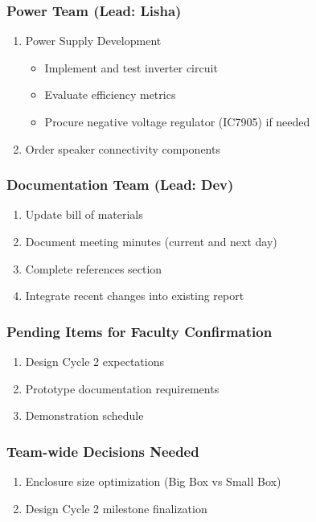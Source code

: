 \documentclass[12pt,a4paper]{article}
\begin{document}
\subsubsection*{Power Team (Lead: Lisha)}
\begin{enumerate}
    \item Power Supply Development
    \begin{itemize}
        \item Implement and test inverter circuit
        \item Evaluate efficiency metrics
        \item Procure negative voltage regulator (IC7905) if needed
    \end{itemize}
    \item Order speaker connectivity components
\end{enumerate}

\subsubsection*{Documentation Team (Lead: Dev)}
\begin{enumerate}
    \item Update bill of materials
    \item Document meeting minutes (current and next day)
    \item Complete references section
    \item Integrate recent changes into existing report
\end{enumerate}

\subsubsection*{Pending Items for Faculty Confirmation}
\begin{enumerate}
    \item Design Cycle 2 expectations
    \item Prototype documentation requirements
    \item Demonstration schedule
\end{enumerate}

\subsubsection*{Team-wide Decisions Needed}
\begin{enumerate}
    \item Enclosure size optimization (Big Box vs Small Box)
    \item Design Cycle 2 milestone finalization
\end{enumerate}
\end{document}

